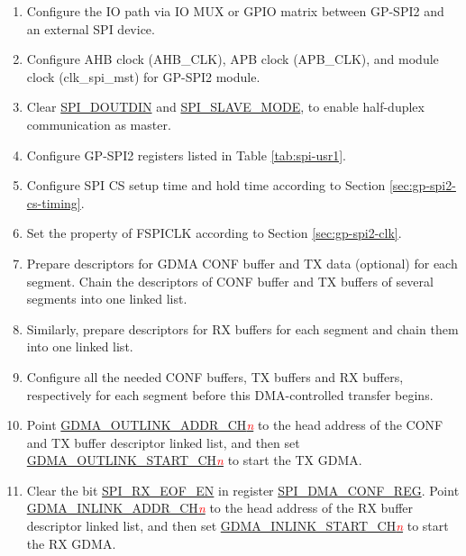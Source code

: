 \documentclass[main\_\_EN.tex]{subfiles}
\begin{document}
 \begin{enumerate}
    \item Configure the IO path via IO MUX or GPIO matrix between GP-SPI2 and an external SPI device. 
    \item Configure AHB clock (AHB\_CLK), APB clock (APB\_CLK), and module clock (clk\_spi\_mst) for GP-SPI2 module.

    \item Clear \hyperref[fielddesc:SPIDOUTDIN]{SPI\_DOUTDIN} and \hyperref[fielddesc:SPISLAVEMODE]{SPI\_SLAVE\_MODE}, to enable half-duplex communication as master.
    
    \item Configure GP-SPI2 registers listed in Table \ref{tab:spi-usr1}.
    
    \item Configure SPI CS setup time and hold time according to Section \ref{sec:gp-spi2-cs-timing}.
    
    \item Set the property of FSPICLK according to Section \ref{sec:gp-spi2-clk}. 
 
   \item Prepare descriptors for GDMA CONF buffer and TX data (optional) for each segment. Chain the descriptors of CONF buffer and TX buffers of several segments into one linked list.
   
   \item Similarly, prepare descriptors for RX buffers for each segment and chain them into one linked list. 
   \item Configure all the needed CONF buffers, TX buffers and RX buffers, respectively for each segment before this DMA-controlled transfer begins.
   
   \item Point \hyperref[fielddesc:GDMAOUTLINKADDRCHN]{GDMA\_OUTLINK\_ADDR\_CH\textcolor{red}{\it{n}}} to the head address of the CONF and TX buffer descriptor linked list, and then set \hyperref[fielddesc:GDMAOUTLINKSTARTCHN]{GDMA\_OUTLINK\_START\_CH\textcolor{red}{\it{n}}} to start the TX GDMA.

   \item Clear the bit \hyperref[fielddesc:SPIRXEOFEN]{SPI\_RX\_EOF\_EN} in register \hyperref[regdesc:SPIDMACONFREG]{SPI\_DMA\_CONF\_REG}. Point \hyperref[fielddesc:GDMAINLINKADDRCHN]{GDMA\_INLINK\_ADDR\_CH\textcolor{red}{\it{n}}} to the head address of the RX buffer descriptor linked list, and then set \hyperref[fielddesc:GDMAINLINKSTARTCHN]{GDMA\_INLINK\_START\_CH\textcolor{red}{\it{n}}} to start the RX GDMA. 
      

\end{enumerate}
\end{document}
